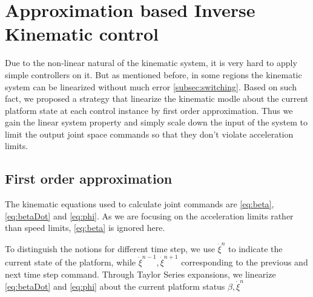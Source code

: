\chapter{Approximation based Inverse Kinematic control}
\label{cha:inverseKinematics}
Due to the non-linear natural of the kinematic system, it is very hard to apply simple controllers on it. But as mentioned before, in some regions the kinematic system can be linearized without much error \cref{subsec:switching}. Based on such fact, we proposed a strategy that linearize the kinematic modle about the current platform state at each control instance by first order approximation. Thus we gain the linear system property and simply scale down the input of the system to limit the output joint space commands so that they don't violate acceleration limits.


\section{First order approximation}
\label{sec:firstOrderApp}
The kinematic equations used to calculate joint commands are \cref{eq:beta},\cref{eq:betaDot} and \cref{eq:phi}. As we are focusing on the acceleration limits rather than speed limits, \cref{eq:beta} is ignored here.

To distinguish the notions for different time step, we use $\dot{\xi}^n$ to indicate the current state of the platform, while $\dot{\xi}^{n-1},\dot{\xi}^{n+1}$ corresponding to the previous and next time step command.
Through Taylor Series expansions, we linearize \cref{eq:betaDot} and \cref{eq:phi} about the current platform status $\beta, \dot{\xi}^{n}$

